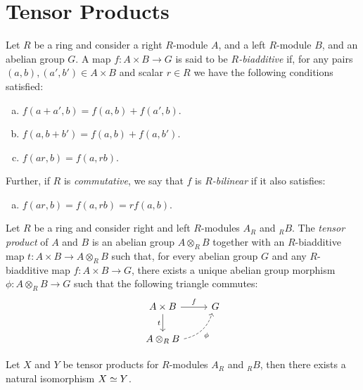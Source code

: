 \section{Tensor Products}

\begin{definition}
\label{def:biadditive-and-bilinear-maps}
Let \(R\) be a ring and consider a right \(R\)-module \(A\), and a left
\(R\)-module \(B\), and an abelian group \(G\). A map \(f: A \times B \to G\) is
said to be \emph{\(R\)-biadditive} if, for any pairs \((a, b), (a', b') \in A \times
B\) and scalar \(r \in R\) we have the following conditions satisfied:
\begin{enumerate}[(a)]\setlength\itemsep{0em}
\item \(f(a + a', b) = f(a, b) + f(a', b)\).
\item \(f(a, b + b') = f(a, b) + f(a, b')\).
\item \(f(a r, b) = f(a, r b)\).
\end{enumerate}
Further, if \(R\) is \emph{commutative}, we say that \(f\) is
\emph{\(R\)-bilinear} if it also satisfies:
\begin{enumerate}[(a)]\setlength\itemsep{0em}\setcounter{enumi}{3}
\item \(f(a r, b) = f(a, rb) = r f(a, b)\).
\end{enumerate}
\end{definition}

\begin{definition}
\label{def:tensor-product}
Let \(R\) be a ring and consider right and left \(R\)-modules \(A_R\) and
\({}_RB\). The \emph{tensor product} of \(A\) and \(B\) is an abelian group
\(A \otimes_R B\) together with an \(R\)-biadditive map
\(t: A \times B \to A \otimes_R B\) such that, for every abelian group \(G\) and
any \(R\)-biadditive map \(f: A \times B \to G\), there exists a unique abelian
group morphism \(\phi: A \otimes_R B \to G\) such that the following triangle
commutes:
\[
\begin{tikzcd}
A \times B \ar[d, "t"'] \ar[r, "f"] &G \\
A \otimes_R B \ar[ru, dashed, "\phi"', bend right] &
\end{tikzcd}
\]
\end{definition}

\begin{lemma}
\label{lem:tensor-product-unique-up-to-iso}
Let \(X\) and \(Y\) be tensor products for \(R\)-modules \(A_R\) and \({}_RB\),
then there exists a natural isomorphism \(X \simeq Y\).
\end{lemma}

